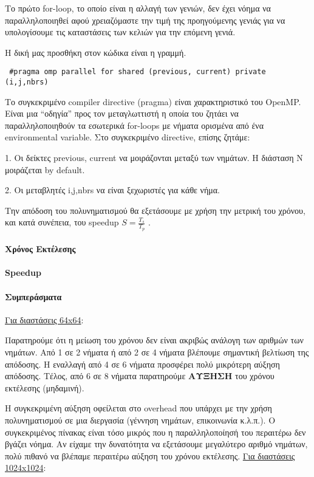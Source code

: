 \documentclass[letterpaper,12pt]{article}
\begin{document}
Το πρώτο for-loop, το οποίο είναι η αλλαγή των γενιών, δεν έχει νόημα να παραλληλοποιηθεί αφού χρειαζόμαστε την τιμή της προηγούμενης γενιάς για να υπολογίσουμε τις καταστάσεις των κελιών για την επόμενη γενιά. \newline

Η δική μας προσθήκη στον κώδικα είναι η γραμμή.

\begin{lstlisting}
 #pragma omp parallel for shared (previous, current) private (i,j,nbrs)
\end{lstlisting}


Το συγκεκριμένο compiler directive (pragma) είναι χαρακτηριστικό του OpenMP. Είναι μια “οδηγία” προς τον μεταγλωττιστή η οποία του ζητάει να παραλληλοποιηθούν τα εσωτερικά for-loops με νήματα ορισμένα από ένα environmental variable. Στο συγκεκριμένο directive, επίσης ζητάμε:

1.	Οι δείκτες previous, current να μοιράζονται μεταξύ των νημάτων. Η διάσταση Ν μοιράζεται by default.

2.	Οι μεταβλητές i,j,nbrs να είναι ξεχωριστές για κάθε νήμα.
\newline

Την απόδοση του πολυνηματισμού θα εξετάσουμε με χρήση την μετρική του χρόνου, και κατά συνέπεια, του speedup $S=\frac{T_s}{T_p}$ . \newline


\paragraph{Χρόνος Εκτέλεσης}
\paragraph{Speedup}

\paragraph{Συμπεράσματα} \hfill \break
\underline{Για διαστάσεις 64x64}:

Παρατηρούμε ότι η μείωση του χρόνου δεν είναι ακριβώς ανάλογη των αριθμών των νημάτων. Από 1 σε 2 νήματα ή από 2 σε 4 νήματα βλέπουμε σημαντική βελτίωση της απόδοσης. Η εναλλαγή από 4 σε 6 νήματα προσφέρει πολύ μικρότερη αύξηση απόδοσης. Τέλος, από 6 σε 8 νήματα παρατηρούμε \textbf{ΑΥΞΗΣΗ} του χρόνου εκτέλεσης (μηδαμινή). 

Η συγκεκριμένη αύξηση οφείλεται στο overhead που υπάρχει με την χρήση πολυνηματισμού σε μια διεργασία (γέννηση νημάτων, επικοινωνία κ.λ.π.). Ο συγκεκριμένος πίνακας είναι τόσο μικρός που η παραλληλοποίησή του περαιτέρω δεν βγάζει νόημα. Αν είχαμε την δυνατότητα να εξετάσουμε μεγαλύτερο αριθμό νημάτων, πολύ πιθανό να βλέπαμε περαιτέρω αύξηση του χρόνου εκτέλεσης.\newline
\underline{Για διαστάσεις 1024x1024}:
\end{document}

